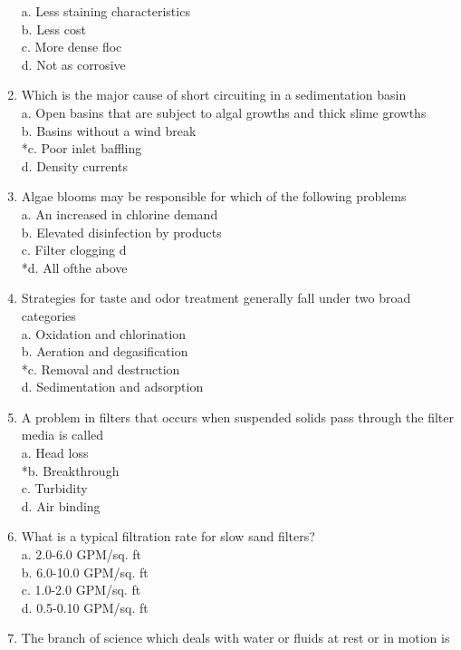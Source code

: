 \begin{enumerate}
a.  Less staining characteristics\\
b.  Less cost\\
c.  More dense floc\\
d.  Not as corrosive\\
\item Which is the major cause of short circuiting in a sedimentation basin\\
a.  Open basins that are subject to algal growths and thick slime growths\\
b.  Basins without a wind break\\
*c.  Poor inlet baffling\\
d.  Density currents\\
\item Algae blooms may be responsible for which of the following problems\\
a.  An increased in chlorine demand\\
b.  Elevated disinfection by products\\
c.  Filter clogging d\\
*d.  All ofthe above\\
\item Strategies for taste and odor treatment generally fall under two broad categories\\
a.  Oxidation and chlorination\\
b.  Aeration and degasification\\
*c.  Removal and destruction\\
d.  Sedimentation and adsorption\\
\item A problem in filters that occurs when suspended solids pass through the filter media is called\\
a.  Head loss\\
*b.  Breakthrough\\
c.  Turbidity\\
d.  Air binding\\
\item What is a typical filtration rate for slow sand filters?\\
a.  2.0-6.0 GPM/sq. ft\\
b.  6.0-10.0 GPM/sq. ft\\
c.  1.0-2.0 GPM/sq. ft\\
d.  0.5-0.10 GPM/sq. ft\\
\item The branch of science which deals with water or fluids at rest or in motion is\\

\end{enumerate}
